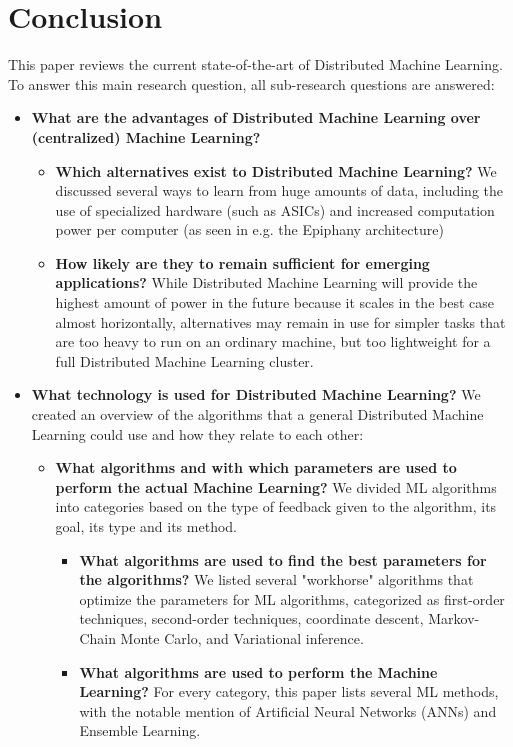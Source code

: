 \section{Conclusion}
This paper reviews the current state-of-the-art of Distributed Machine Learning. To answer this main research question, all sub-research questions are answered:
\begin{itemize}
	\item \textbf{What are the advantages of Distributed Machine Learning over (centralized) Machine Learning?}
	\begin{itemize}
		\item \textbf{Which alternatives exist to Distributed Machine Learning?} We discussed several ways to learn from huge amounts of data, including the use of specialized hardware (such as ASICs) and increased computation power per computer (as seen in e.g. the Epiphany architecture)
		\item \textbf{How likely are they to remain sufficient for emerging applications?} While Distributed Machine Learning will provide the highest amount of power in the future because it scales in the best case almost horizontally, alternatives may remain in use for simpler tasks that are too heavy to run on an ordinary machine, but too lightweight for a full Distributed Machine Learning cluster.
	\end{itemize}
	\item \textbf{What technology is used for Distributed Machine Learning?} We created an overview of the algorithms that a general Distributed Machine Learning could use and how they relate to each other:
	\begin{itemize}
		\item \textbf{What algorithms and with which parameters are used to perform the actual Machine Learning?} We divided ML algorithms into categories based on the type of feedback given to the algorithm, its goal, its type and its method.
		\begin{itemize}
			\item \textbf{What algorithms are used to find the best parameters for the algorithms?} We listed several "workhorse" algorithms that optimize the parameters for ML algorithms, categorized as first-order techniques, second-order techniques, coordinate descent, Markov-Chain Monte Carlo, and Variational inference.
			\item \textbf{What algorithms are used to perform the Machine Learning?} For every category, this paper lists several ML methods, with the notable mention of Artificial Neural Networks (ANNs) and Ensemble Learning.

\end{itemize}
\end{itemize}
\end{itemize}
